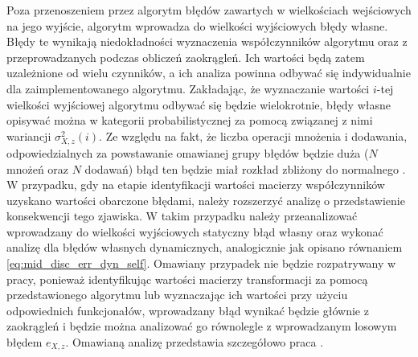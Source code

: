 Poza przenoszeniem przez algorytm błędów zawartych w wielkościach wejściowych na jego wyjście, algorytm wprowadza do wielkości wyjściowych błędy własne. Błędy te wynikają niedokładności wyznaczenia współczynników algorytmu oraz z przeprowadzanych podczas obliczeń zaokrągleń. Ich wartości będą zatem uzależnione od wielu czynników, a ich analiza powinna odbywać się indywidualnie dla zaimplementowanego algorytmu. Zakładając, że wyznaczanie wartości $i$-tej wielkości wyjściowej algorytmu odbywać się będzie wielokrotnie, błędy własne opisywać można w kategorii probabilistycznej za pomocą związanej z nimi wariancji $\sigma_{X,z}^{2}(i)$. Ze względu na fakt, że liczba operacji mnożenia i dodawania, odpowiedzialnych za powstawanie omawianej grupy błędów będzie duża ($N$ mnożeń oraz $N$ dodawań) błąd ten będzie miał rozkład zbliżony do normalnego \cite{jcgm_guide}. W przypadku, gdy na etapie identyfikacji wartości macierzy współczynników uzyskano wartości obarczone błędami, należy rozszerzyć analizę o przedstawienie konsekwencji tego zjawiska. W takim przypadku należy przeanalizować wprowadzany do wielkości wyjściowych statyczny błąd własny oraz wykonać analizę dla błędów własnych dynamicznych, analogicznie jak opisano równaniem \eqref{eq:mid_disc_err_dyn_self}. Omawiany przypadek nie będzie rozpatrywany w pracy, ponieważ identyfikując wartości macierzy transformacji za pomocą przedstawionego algorytmu lub wyznaczając ich wartości przy użyciu odpowiednich funkcjonałów, wprowadzany błąd wynikać będzie głównie z zaokrągleń i będzie można analizować go równolegle z wprowadzanym losowym błędem $e_{X,z}$. Omawianą analizę przedstawia szczegółowo praca \cite{jakubiec_system}.


